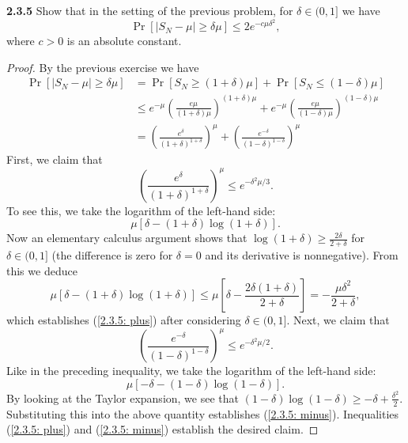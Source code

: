 \documentclass[11pt,letterpaper]{report}
\begin{document}
\noindent\textbf{2.3.5}
Show that in the setting of the previous problem, for $\delta \in (0, 1]$ we have
\[
\Pr[|S_N-\mu|\geq \delta \mu] \leq 2e^{-c\mu\delta^2},
\]
where $c>0$ is an absolute constant.
\begin{proof}
	By the previous exercise we have
	\begin{align*}
		\Pr[|S_N-\mu| \geq \delta \mu] &= \Pr[S_N\geq (1+\delta)\mu] + \Pr[S_N\leq (1-\delta)\mu]\\
		&\leq e^{-\mu}\left(\frac{e\mu}{(1+\delta)\mu}\right)^{(1+\delta)\mu} + e^{-\mu}\left(\frac{e\mu}{(1-\delta)\mu}\right)^{(1-\delta)\mu}\\
		&= \left(\frac{e^\delta}{(1+\delta)^{1+\delta}}\right)^\mu + \left(\frac{e^{-\delta}}{(1-\delta)^{1-\delta}}\right)^\mu
	\end{align*}
	First, we claim that
	\begin{equation}\label{2.3.5: plus}
	\left(\frac{e^\delta}{(1+\delta)^{1+\delta}}\right)^\mu\leq e^{-\delta^2\mu/3}.
	\end{equation}
	To see this, we take the logarithm of the left-hand side:
	\[
	\mu[\delta - (1+\delta)\log(1+\delta)].
	\]
	Now an elementary calculus argument shows that $\log(1+\delta)\geq \frac{2\delta}{2+\delta}$ for $\delta\in (0, 1]$ (the difference is zero for $\delta = 0$ and its derivative is nonnegative). From this we deduce
	\[
	\mu[\delta-(1+\delta)\log(1+\delta)] \leq \mu\left[\delta-\frac{2\delta(1+\delta)}{2+\delta}\right] = -\frac{\mu\delta^2}{2+\delta},
	\]
	which establishes (\ref{2.3.5: plus}) after considering $\delta\in (0,1]$. Next, we claim that
	\begin{equation}\label{2.3.5: minus}
	\left(\frac{e^{-\delta}}{(1-\delta)^{1-\delta}}\right)^\mu \leq e^{-\delta^2\mu/2}.
	\end{equation}
	Like in the preceding inequality, we take the logarithm of the left-hand side:
	\[
	\mu[-\delta-(1-\delta)\log(1-\delta)].
	\]
	By looking at the Taylor expansion, we see that $(1-\delta)\log(1-\delta) \geq -\delta+\frac{\delta^2}{2}$. Substituting this into the above quantity establishes (\ref{2.3.5: minus}). Inequalities (\ref{2.3.5: plus}) and (\ref{2.3.5: minus}) establish the desired claim.
\end{proof}
\end{document}
